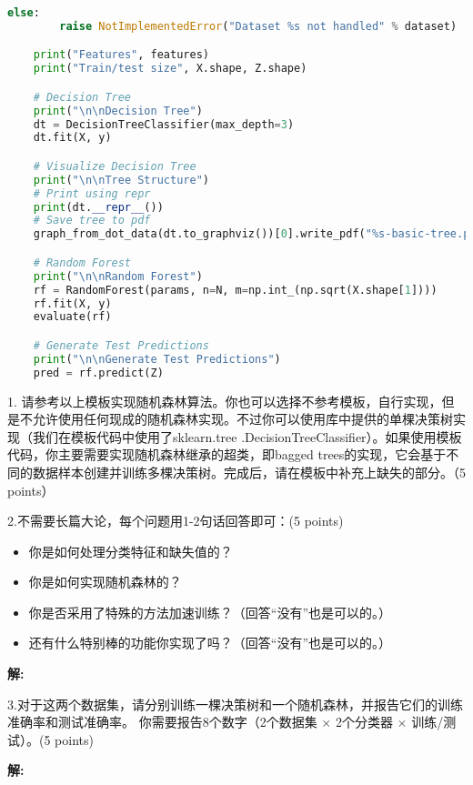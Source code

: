 \documentclass[8pt]{article}
\begin{document}
\begin{lstlisting}[language=Python, caption=随机森林模型接口]
    else:
        raise NotImplementedError("Dataset %s not handled" % dataset)

    print("Features", features)
    print("Train/test size", X.shape, Z.shape)

    # Decision Tree
    print("\n\nDecision Tree")
    dt = DecisionTreeClassifier(max_depth=3)
    dt.fit(X, y)

    # Visualize Decision Tree
    print("\n\nTree Structure")
    # Print using repr
    print(dt.__repr__())
    # Save tree to pdf
    graph_from_dot_data(dt.to_graphviz())[0].write_pdf("%s-basic-tree.pdf" % dataset)

    # Random Forest
    print("\n\nRandom Forest")
    rf = RandomForest(params, n=N, m=np.int_(np.sqrt(X.shape[1])))
    rf.fit(X, y)
    evaluate(rf)

    # Generate Test Predictions
    print("\n\nGenerate Test Predictions")
    pred = rf.predict(Z)

\end{lstlisting}

1. 请参考以上模板实现随机森林算法。你也可以选择不参考模板，自行实现，但是不允许使用任何现成的随机森林实现。不过你可以使用库中提供的单棵决策树实现（我们在模板代码中使用了sklearn.tree .DecisionTreeClassifier）。如果使用模板代码，你主要需要实现随机森林继承的超类，即bagged trees的实现，它会基于不同的数据样本创建并训练多棵决策树。完成后，请在模板中补充上缺失的部分。（5 points）

2.不需要长篇大论，每个问题用1-2句话回答即可：(5 points)
\begin{itemize}
\item 你是如何处理分类特征和缺失值的？
\item 你是如何实现随机森林的？
\item 你是否采用了特殊的方法加速训练？（回答“没有”也是可以的。）
\item 还有什么特别棒的功能你实现了吗？（回答“没有”也是可以的。）
\end{itemize}

\textbf{\large 解:}

\vspace{3em}

3.对于这两个数据集，请分别训练一棵决策树和一个随机森林，并报告它们的训练准确率和测试准确率。  
你需要报告8个数字（2个数据集 $\times$ 2个分类器 $\times$ 训练/测试）。(5 points)

\textbf{\large 解:}

\vspace{3em}
\end{document}
